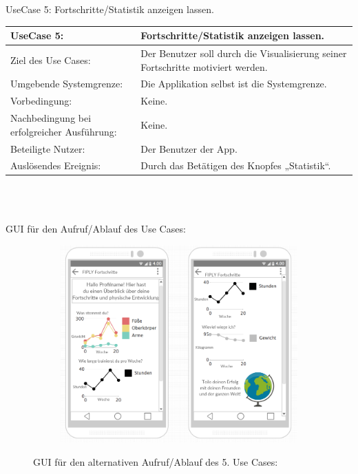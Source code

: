 \documentclass[FIPLY_base.tex]{subfiles}
\begin{document}
	\newpage
	UseCase 5: Fortschritte/Statistik anzeigen lassen.
	\ \\
	\begin{center}
		\def\arraystretch{1.3}%
		\begin{tabular}{| p{5cm} | p{5cm} |}
			\hline
			UseCase 5: & Fortschritte/Statistik anzeigen lassen. \\ \hline 
			Ziel des Use Cases: & Der Benutzer soll durch die Visualisierung seiner Fortschritte motiviert werden. \\ \hline
			Umgebende Systemgrenze: & Die Applikation selbst ist die Systemgrenze. \\ \hline
			Vorbedingung: & Keine.  \\ \hline
			Nachbedingung bei erfolgreicher Ausführung: & Keine.  \\ \hline
			Beteiligte Nutzer: & Der Benutzer der App. \\ \hline
			Auslösendes Ereignis: & Durch das Betätigen des Knopfes „Statistik“. \\ \hline
		\end{tabular} \\
	\end{center}
	\ \\ 
	GUI für den Aufruf/Ablauf des Use Cases:
	\begin{figure}[H]
		\begin{subfigure}[b]{0.3\textwidth}
			\includegraphics[scale=0.32]{img/Fortschrittsanzeige}
		\end{subfigure}
		\caption{GUI für den alternativen Aufruf/Ablauf des 5. Use Cases:}
	\end{figure}
\end{document}
